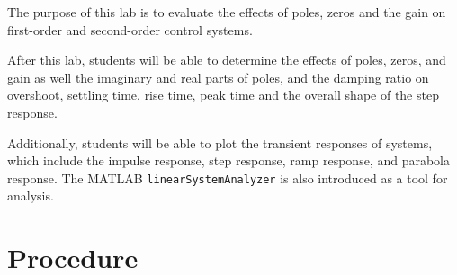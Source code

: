 \documentclass[11pt]{article}
\begin{document}
The purpose of this lab is
to evaluate the effects of poles, zeros and the gain
on first-order and second-order control systems.

After this lab, students will be able
to determine the effects of poles, zeros, and gain
as well the imaginary and real parts of poles,
and the damping ratio
on overshoot, settling time, rise time, peak time
and the overall shape of the step response.

Additionally, students will be able to plot the transient responses of systems, which include
the impulse response, step response, ramp response, and parabola response. The MATLAB \texttt{linearSystemAnalyzer} is also introduced as a tool for analysis.

\section{Procedure}
\end{document}

